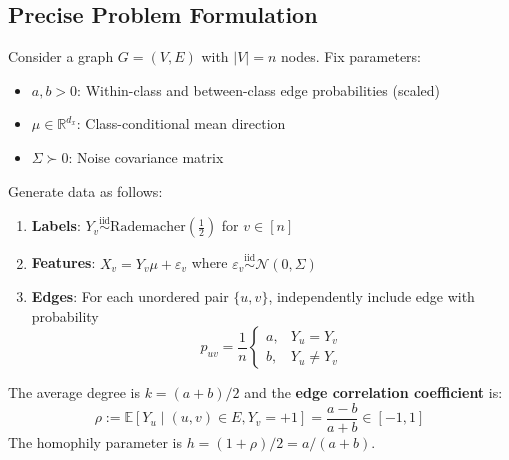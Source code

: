 \subsection{Precise Problem Formulation}
\label{subsec:setup_rigorous}

\begin{definition}
\label{def:sparse_csbm}
Consider a graph $G = (V, E)$ with $|V| = n$ nodes. Fix parameters:
\begin{itemize}
    \item $a, b > 0$: Within-class and between-class edge probabilities (scaled)
    \item $\mu \in \mathbb{R}^{d_x}$: Class-conditional mean direction
    \item $\Sigma \succ 0$: Noise covariance matrix
\end{itemize}

Generate data as follows:
\begin{enumerate}
    \item \textbf{Labels}: $Y_v \stackrel{\text{iid}}{\sim} \mathrm{Rademacher}(\frac{1}{2})$ for $v \in [n]$
    \item \textbf{Features}: $X_v = Y_v \mu + \varepsilon_v$ where $\varepsilon_v \stackrel{\text{iid}}{\sim} \mathcal{N}(0, \Sigma)$
    \item \textbf{Edges}: For each unordered pair $\{u, v\}$, independently include edge with probability
    \begin{equation}
        p_{uv} = \frac{1}{n} \begin{cases}
            a, & Y_u = Y_v \\
            b, & Y_u \neq Y_v
        \end{cases}
    \end{equation}
\end{enumerate}
The average degree is $k = (a+b)/2$ and the \textbf{edge correlation coefficient} is:
\begin{equation}
    \rho := \mathbb{E}[Y_u \mid (u,v) \in E, Y_v = +1] = \frac{a - b}{a + b} \in [-1, 1]
\end{equation}
The homophily parameter is $h = (1+\rho)/2 = a/(a+b)$.
\end{definition}

